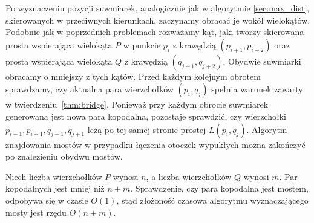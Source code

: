 Po wyznaczeniu pozycji suwmiarek, analogicznie jak w algorytmie
\ref{sec:max_dist}, skierowanych w przeciwnych kierunkach, zaczynamy
obracać je wokół wielokątów. Podobnie jak w poprzednich problemach
rozważamy kąt, jaki tworzy skierowana prosta wspierająca wielokąta $P$
w punkcie $p_i$ z krawędzią $(p_{i+1}, p_{i+2})$ oraz prosta
wspierająca wielokąta $Q$ z krawędzią $(q_{j+1}, q_{j+2})$. Obydwie
suwmiarki obracamy o mniejszy z tych kątów. Przed każdym kolejnym
obrotem sprawdzamy, czy aktualna para wierzchołków $(p_i, q_j)$
spełnia warunek zawarty w twierdzeniu~\ref{thm:bridge}. Ponieważ przy
każdym obrocie suwmiarek generowana jest nowa para kopodalna,
pozostaje sprawdzić, czy wierzchołki $p_{i-1}, p_{i+1}, q_{j-1},
q_{j+1}$ leżą po tej samej stronie prostej $L(p_i, q_j)$. Algorytm
znajdowania mostów w przypadku łączenia otoczek wypukłych można
zakończyć po znalezieniu obydwu mostów.

Niech liczba wierzchołków $P$ wynosi $n$, a liczba wierzchołków $Q$
wynosi $m$. Par kopodalnych jest mniej niż $n + m$. Sprawdzenie, czy
para kopodalna jest mostem, odpobywa się w czasie $O(1)$, stąd
złożoność czasowa algorytmu wyznaczającego mosty jest rzędu $O(n +
m)$.

